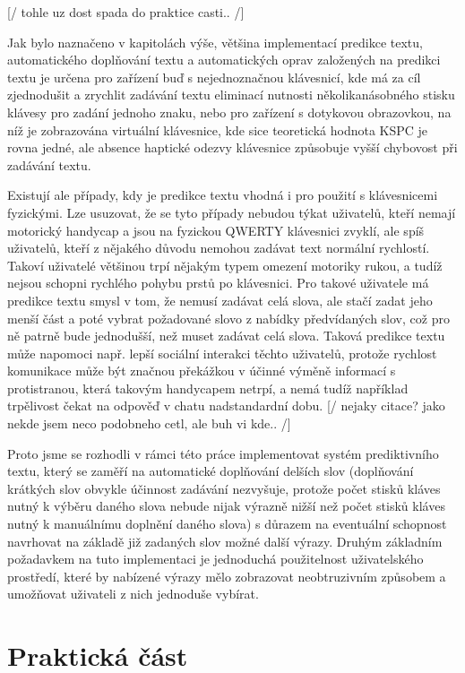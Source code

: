 \documentclass{article}
\begin{document}
[/ tohle uz dost spada do praktice casti.. /]

Jak bylo naznačeno v kapitolách výše, většina implementací predikce textu, automatického doplňování textu a automatických oprav založených na predikci textu je určena pro zařízení buď s nejednoznačnou klávesnicí, kde má za cíl zjednodušit a zrychlit zadávání textu eliminací nutnosti několikanásobného stisku klávesy pro zadání jednoho znaku, nebo pro zařízení s dotykovou obrazovkou, na níž je zobrazována virtuální klávesnice, kde sice teoretická hodnota KSPC je rovna jedné, ale absence haptické odezvy klávesnice způsobuje vyšší chybovost při zadávání textu. 

Existují ale případy, kdy je predikce textu vhodná i pro použití s klávesnicemi fyzickými. Lze usuzovat, že se tyto případy nebudou týkat uživatelů, kteří nemají motorický handycap a jsou na fyzickou QWERTY klávesnici zvyklí, ale spíš uživatelů, kteří z nějakého důvodu nemohou zadávat text normální rychlostí. Takoví uživatelé většinou trpí nějakým typem omezení motoriky rukou, a tudíž nejsou schopni rychlého pohybu prstů po klávesnici. Pro takové uživatele má predikce textu smysl v tom, že nemusí zadávat celá slova, ale stačí zadat jeho menší část a poté vybrat požadované slovo z nabídky předvídaných slov, což pro ně patrně bude jednodušší, než muset zadávat celá slova. Taková predikce textu může napomoci např. lepší sociální interakci těchto uživatelů, protože rychlost komunikace může být značnou překážkou v účinné výměně informací s protistranou, která takovým handycapem netrpí, a nemá tudíž například trpělivost čekat na odpověď v chatu nadstandardní dobu. [/ nejaky citace? jako nekde jsem neco podobneho cetl, ale buh vi kde..   /]

Proto jsme se rozhodli v rámci této práce implementovat systém prediktivního textu, který se zaměří na automatické doplňování delších slov (doplňování krátkých slov obvykle účinnost zadávání nezvyšuje, protože počet stisků kláves nutný k výběru daného slova nebude nijak výrazně nižší než počet stisků kláves nutný k manuálnímu doplnění daného slova) s důrazem na eventuální schopnost navrhovat na základě již zadaných slov možné další výrazy. Druhým základním požadavkem na tuto implementaci je jednoduchá použitelnost uživatelského prostředí, které by nabízené výrazy mělo zobrazovat neobtruzivním způsobem a umožňovat uživateli z nich jednoduše vybírat.



\section{Praktická část}
\end{document}
